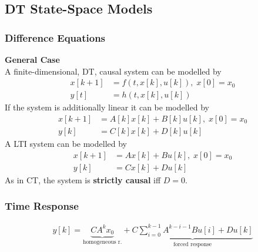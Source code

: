 \subsection{DT State-Space Models}
\subsubsection{Difference Equations}
\textbf{General Case}\\
A finite-dimensional, DT, causal system can be modelled by
\noindent\begin{align*}
    x[k+1] & =f(t,x[k],u[k]), \; x[0]=x_0 \\
    y[t]   & =h(t,x[k],u[k])
\end{align*}
If the system is additionally linear it can be modelled by
\noindent\begin{align*}
    x[k+1] & =A[k]x[k]+B[k]u[k], \; x[0]=x_0 \\
    y[k]   & =C[k]x[k]+D[k]u[k]
\end{align*}
A LTI system can be modelled by
\noindent\begin{align*}
    x[k+1] & =Ax[k]+Bu[k], \; x[0]=x_0 \\
    y[k]   & =Cx[k]+Du[k]
\end{align*}
As in CT, the system is \textbf{strictly causal} iff $D=0$.
\subsubsection{Time Response}
\noindent\begin{align*}
    y[k]=\underbrace{CA^kx_0}_{\text{homogeneous r.}} + \underbrace{C\sum_{i=0}^{k-1}A^{k-i-1}Bu[i]+Du[k]}_{\text{forced response}}
\end{align*}
